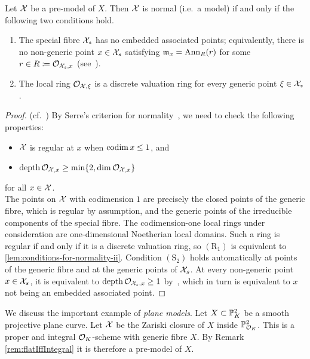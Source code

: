\begin{lemma}\label{lem:conditions-for-normality}
    Let $\mathcal X$ be a pre-model of $X$.
    Then $\mathcal X$ is normal (i.e.\ a model) if and only if the following two conditions hold.
    \begin{enumerate}[label=\textup{(\alph*)}]
        \item The special fibre $\mathcal X_s$ has no embedded associated points; equivalently, there is no non-generic point $x\in \mathcal X_s$ \label{lem:conditions-for-normality-i}
            satisfying $\mathfrak m_x = \mathrm{Ann}_{R}(r)$ for some $r\in R \coloneqq \mathcal{O}_{\mathcal X_s,x}$ (see~\cite[Definition 7.1.6]{Liu}).
        \item The local ring $\mathcal{O}_{\mathcal X,\xi}$ is a discrete valuation ring for every generic point $\xi \in \mathcal X_s$. \label{lem:conditions-for-normality-ii}
    \end{enumerate}
\end{lemma}

\begin{proof}
    (cf.\ \cite[Lemma 2.1]{ArzdorfWewers}) By Serre's criterion for normality~\cite[Theorem 8.2.23]{Liu},
    we need to check the following properties:
    \begin{itemize}
        \item[$(\mathrm{R}_1)$] $\mathcal X$ is regular at $x$ when $\operatorname{codim}{x} \leq 1$, and
        \item[$(\mathrm{S}_2)$] $\operatorname{depth}{\mathcal{O}_{\mathcal X,x}} \geq \min\{2,\operatorname{dim_{}}\mathcal{O}_{\mathcal X,x}\}$
    \end{itemize}
    for all $x\in \mathcal X$. \\
    The points on $\mathcal X$ with codimension $1$ are precisely the closed points of the generic fibre, which is regular by assumption,
    and the generic points of the irreducible components of the special fibre.
    The codimension-one local rings under consideration are one-dimensional Noetherian local domains.
    Such a ring is regular if and only if it is a discrete valuation ring, so $(\mathrm{R}_1)$ is equivalent to
    \ref{lem:conditions-for-normality-ii}.
    Condition $(\mathrm{S}_2)$ holds automatically at points of the generic fibre and at the generic points of $\mathcal X_s$.
    At every non-generic point $x\in\mathcal X_s$, it is equivalent to $\operatorname{depth}{\mathcal{O}_{\mathcal X_s,x}}\geq1$ by~\cite[Proposition 8.2.11]{Liu}, which in turn is equivalent to $x$ not being an embedded associated point.
\end{proof}


We discuss the important example of \emph{plane models}. Let $X\subset\mathbb P^2_K$ be a smooth projective plane curve. Let $\mathcal X$ be the Zariski closure of $X$ inside $\mathbb P^2_{\mathcal O_K}$. This is a proper and integral $\mathcal O_K$-scheme with generic fibre $X$. By Remark \ref{rem:flatIffIntegral} it is therefore a pre-model of $X$.

